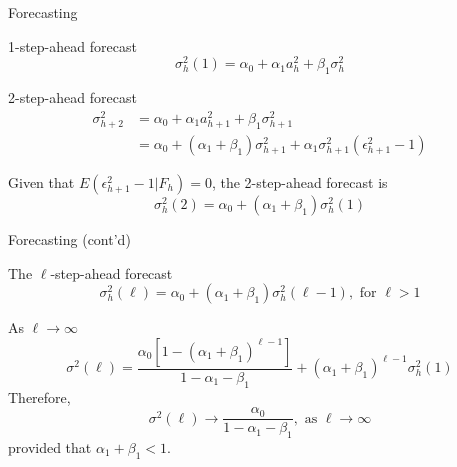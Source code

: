 \documentclass[presentation,10pt]{beamer}
\begin{document}
\begin{frame}[label={sec:orgf602572}]{Forecasting}
\begin{block}{1-step-ahead forecast}
\begin{equation*}
\sigma^2_h(1) = \alpha_0 + \alpha_1 a^2_h + \beta_1 \sigma^2_h
\end{equation*}
\end{block}

\begin{block}{2-step-ahead forecast}
\begin{equation}
\begin{split}
\sigma^2_{h+2} &= \alpha_0 + \alpha_1 a^2_{h+1} + \beta_1 \sigma^2_{h+1} \\
&= \alpha_0 + (\alpha_1 + \beta_1) \sigma^2_{h+1} + \alpha_1 \sigma^2_{h+1}(\epsilon^2_{h+1}-1)
\end{split}
\end{equation}

Given that \(E(\epsilon^2_{h+1} - 1 | F_h) = 0\), the 2-step-ahead
forecast is
\[ \sigma^2_h(2) = \alpha_0 + (\alpha_1 + \beta_1)\sigma^2_h(1) \]
\end{block}
\end{frame}

\begin{frame}[label={sec:org6741465}]{Forecasting (cont'd)}
\begin{block}{The \(\ell\)-step-ahead forecast}
\[ \sigma^2_h(\ell) = \alpha_0 + (\alpha_1 +
\beta_1)\sigma^2_h(\ell-1), \text{ for } \ell > 1 \]
\end{block}

\begin{block}{As \(\ell \rightarrow \infty\)}
\begin{equation*}
\sigma^2(\ell) =
\frac{\alpha_0\left[1-(\alpha_1+\beta_1)^{\ell-1}\right]}{1-\alpha_1-\beta_1}
+ (\alpha_1+\beta_1)^{\ell-1}\sigma^2_h(1)
\end{equation*}
Therefore,
\begin{equation*}
\sigma^2(\ell) \rightarrow \frac{\alpha_0}{1-\alpha_1-\beta_1}, \text{ as } \ell\rightarrow\infty
\end{equation*}
provided that \(\alpha_1+\beta_1<1\). 
\end{block}
\end{frame}
\end{document}

